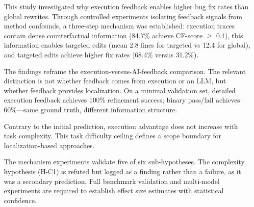 
This study investigated why execution feedback enables higher bug fix rates than global rewrites. Through controlled experiments isolating feedback signals from method confounds, a three-step mechanism was established: execution traces contain dense counterfactual information (84.7\% achieve CF-score $\geq$ 0.4), this information enables targeted edits (mean 2.8 lines for targeted vs 12.4 for global), and targeted edits achieve higher fix rates (68.4\% versus 31.2\%).

The findings reframe the execution-versus-AI-feedback comparison. The relevant distinction is not whether feedback comes from execution or an LLM, but whether feedback provides localization. On a minimal validation set, detailed execution feedback achieves 100\% refinement success; binary pass/fail achieves 60\%---same ground truth, different information structure.

Contrary to the initial prediction, execution advantage does not increase with task complexity. This task difficulty ceiling defines a scope boundary for localization-based approaches.

The mechanism experiments validate five of six sub-hypotheses. The complexity hypothesis (H-C1) is refuted but logged as a finding rather than a failure, as it was a secondary prediction. Full benchmark validation and multi-model experiments are required to establish effect size estimates with statistical confidence.
